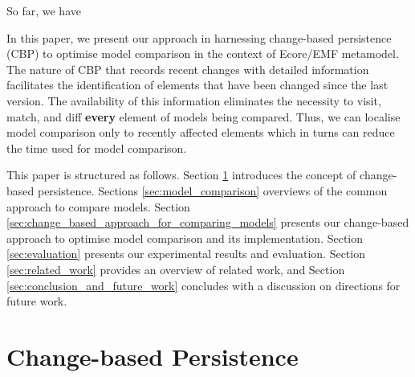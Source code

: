 \documentclass{llncs}
\begin{document}
So far, we have 

In this paper, we present our approach in harnessing change-based persistence (CBP) to optimise model comparison in the context of Ecore/EMF metamodel. The nature of CBP that records recent changes with detailed information facilitates the identification of elements that have been changed since the last version. The availability of this information eliminates the necessity to visit, match, and diff \textbf{every} element of models being compared. Thus, we can localise model comparison only to recently affected elements which in turns can reduce the time used for model comparison.

This paper is structured as follows. Section \ref{sec:change-based_persistence} introduces the concept of change-based persistence. Sections \ref{sec:model_comparison} overviews of the common approach to compare models.
Section \ref{sec:change_based_approach_for_comparing_models} presents our change-based approach to optimise model comparison and its implementation. Section \ref{sec:evaluation} presents our experimental results and evaluation. Section \ref{sec:related_work} provides an overview of related work, and Section \ref{sec:conclusion_and_future_work} concludes with a discussion on directions for future work.


\section{Change-based Persistence}
\label{sec:change-based_persistence}
\end{document}
